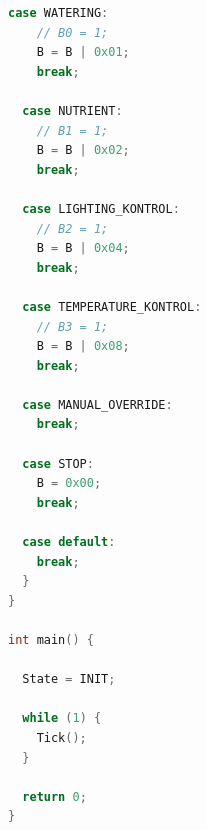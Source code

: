 \documentclass[12pt]{article}
\begin{document}
\begin{lstlisting}[language=C]
  case WATERING:
    // B0 = 1;
    B = B | 0x01;
    break;

  case NUTRIENT:
    // B1 = 1;
    B = B | 0x02;
    break;

  case LIGHTING_KONTROL:
    // B2 = 1;
    B = B | 0x04;
    break;

  case TEMPERATURE_KONTROL:
    // B3 = 1;
    B = B | 0x08;
    break;

  case MANUAL_OVERRIDE:
    break;

  case STOP:
    B = 0x00;
    break;

  case default:
    break;
  }
}

int main() {

  State = INIT;

  while (1) {
    Tick();
  }

  return 0;
}

  \end{lstlisting}
 
\end{document}
